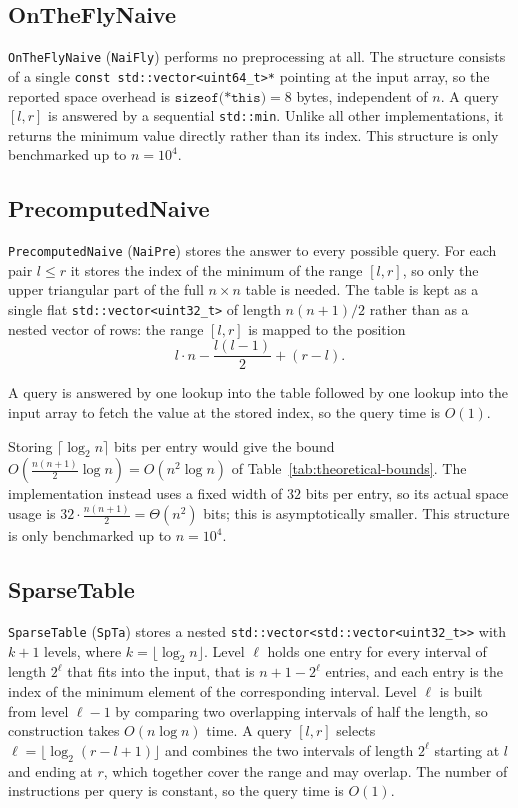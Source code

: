 \documentclass[a4paper,UKenglish,cleveref,thm-restate]{lipics-v2021}
\begin{document}
\subsection{OnTheFlyNaive}
\texttt{OnTheFlyNaive} (\texttt{NaiFly}) performs no preprocessing at all. The
structure consists of a single \texttt{const std::vector<uint64\_t>*} pointing at
the input array, so the reported space overhead is $\texttt{sizeof(*this)} = 8$
bytes, independent of $n$. A query $[l,r]$ is answered by a sequential
\texttt{std::min}. Unlike all other implementations, it returns the minimum value directly rather than its index.
This structure is only benchmarked up to $n = 10^4$.

\subsection{PrecomputedNaive}
\texttt{PrecomputedNaive} (\texttt{NaiPre}) stores the answer to every possible
query. For each pair $l \le r$ it stores the index of the minimum of the range
$[l,r]$, so only the upper triangular part of the full $n \times n$ table is
needed.
The table is kept as a single flat \texttt{std::vector<uint32\_t>} of length
$n(n+1)/2$ rather than as a nested vector of rows: the range $[l,r]$ is mapped to
the position
\[
	l \cdot n - \frac{l(l-1)}{2} + (r-l).
\]

A query is answered by one lookup into the table followed by one lookup into the
input array to fetch the value at the stored index, so the query time is $O(1)$.

Storing $\lceil \log_2 n \rceil$ bits per entry would give the bound
$O\!\left(\frac{n(n+1)}{2}\log n\right) = O(n^2 \log n)$ of
Table~\ref{tab:theoretical-bounds}. The implementation instead uses a fixed width
of $32$ bits per entry, so its actual space usage is
$32 \cdot \frac{n(n+1)}{2} = \Theta(n^2)$ bits; this is asymptotically smaller.
This structure is only benchmarked up to $n = 10^4$.

\subsection{SparseTable}
\texttt{SparseTable} (\texttt{SpTa}) stores a nested \texttt{std::vector<std::vector<uint32\_t>{}>} with $k+1$ levels, where $k = \lfloor \log_2 n \rfloor$.
Level $\ell$ holds one entry for every interval of length $2^\ell$ that fits into the input, that is $n+1-2^\ell$ entries, and each entry is the index of the minimum element of the corresponding interval.
Level $\ell$ is built from level $\ell-1$ by comparing two overlapping intervals of half the length, so construction takes $O(n \log n)$ time.
A query $[l,r]$ selects $\ell = \lfloor \log_2 (r-l+1) \rfloor$ and combines the two intervals of length $2^\ell$ starting at $l$ and ending at $r$, which together cover the range and may overlap.
The number of instructions per query is constant, so the query time is $O(1)$.
\end{document}
